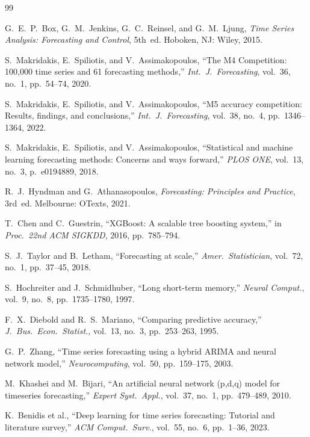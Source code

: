 \documentclass[journal]{IEEEtran}
\begin{document}

\begin{thebibliography}{99}

G.~E.~P.~Box, G.~M.~Jenkins, G.~C.~Reinsel, and G.~M.~Ljung,
\emph{Time Series Analysis: Forecasting and Control}, 5th~ed.
Hoboken, NJ: Wiley, 2015.

S.~Makridakis, E.~Spiliotis, and V.~Assimakopoulos,
``The M4 Competition: 100,000 time series and 61 forecasting methods,''
\emph{Int.\ J.\ Forecasting}, vol.~36, no.~1, pp.~54--74, 2020.

S.~Makridakis, E.~Spiliotis, and V.~Assimakopoulos,
``M5 accuracy competition: Results, findings, and conclusions,''
\emph{Int.\ J.\ Forecasting}, vol.~38, no.~4, pp.~1346--1364, 2022.

S.~Makridakis, E.~Spiliotis, and V.~Assimakopoulos,
``Statistical and machine learning forecasting methods: Concerns and ways forward,''
\emph{PLOS ONE}, vol.~13, no.~3, p.~e0194889, 2018.

R.~J.~Hyndman and G.~Athanasopoulos,
\emph{Forecasting: Principles and Practice}, 3rd~ed.
Melbourne: OTexts, 2021.

T.~Chen and C.~Guestrin,
``XGBoost: A scalable tree boosting system,''
in \emph{Proc.\ 22nd ACM SIGKDD}, 2016, pp.~785--794.

S.~J.~Taylor and B.~Letham,
``Forecasting at scale,''
\emph{Amer.\ Statistician}, vol.~72, no.~1, pp.~37--45, 2018.

S.~Hochreiter and J.~Schmidhuber,
``Long short-term memory,''
\emph{Neural Comput.}, vol.~9, no.~8, pp.~1735--1780, 1997.

F.~X.~Diebold and R.~S.~Mariano,
``Comparing predictive accuracy,''
\emph{J.\ Bus.\ Econ.\ Statist.}, vol.~13, no.~3, pp.~253--263, 1995.

G.~P.~Zhang,
``Time series forecasting using a hybrid ARIMA and neural network model,''
\emph{Neurocomputing}, vol.~50, pp.~159--175, 2003.

M.~Khashei and M.~Bijari,
``An artificial neural network (p,d,q) model for timeseries forecasting,''
\emph{Expert Syst.\ Appl.}, vol.~37, no.~1, pp.~479--489, 2010.

K.~Benidis et al.,
``Deep learning for time series forecasting: Tutorial and literature survey,''
\emph{ACM Comput.\ Surv.}, vol.~55, no.~6, pp.~1--36, 2023.


\end{thebibliography}
\end{document}
